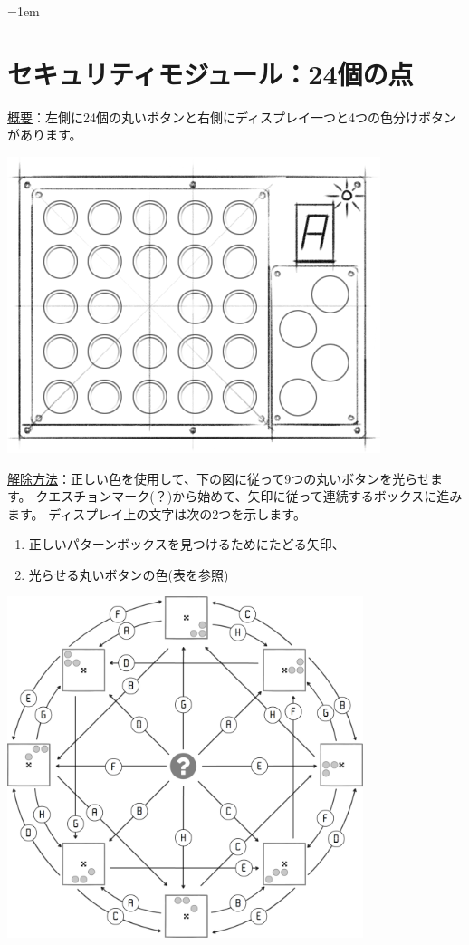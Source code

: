 \begin{minipage}{0.63\textwidth}
    \parskip=1em
    \section*{セキュリティモジュール：24個の点}
    
    \uline{概要}：左側に24個の丸いボタンと右側にディスプレイ一つと4つの色分けボタンがあります。
\end{minipage}%
\hfill%
\begin{minipage}{0.33\textwidth}
    \includegraphics[width=\textwidth]{images/62.png}
    \vspace*{\fill}
\end{minipage}
\uline{解除方法}：正しい色を使用して、下の図に従って9つの丸いボタンを光らせます。
クエスチョンマーク(？)から始めて、矢印に従って連続するボックスに進みます。
ディスプレイ上の文字は次の2つを示します。
\begin{enumerate}
    \item 正しいパターンボックスを見つけるためにたどる矢印、
    \item 光らせる丸いボタンの色(表を参照)
\end{enumerate}

\includegraphics[width=0.78\textwidth]{images/55.png}

